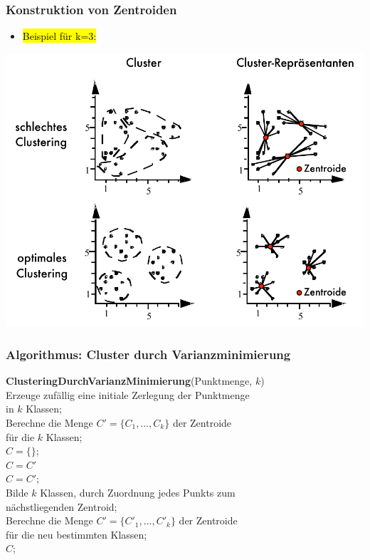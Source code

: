 \begin{frame}
\frametitle{Konstruktion von Zentroiden}

\begin{itemize}
\item \hl{Beispiel für k=3:}
\end{itemize}


\begin{center}
\includegraphics[scale=.5]{fig7/zentroiden-bsp.pdf}
\end{center}

\end{frame}


\begin{frame}
\frametitle{Algorithmus: Cluster durch  Varianzminimierung}

\begin{algo}
\textbf{ClusteringDurchVarianzMinimierung}(Punktmenge, $k$) \\
\1 \textrm{Erzeuge zufällig eine initiale Zerlegung der Punktmenge} \\
\2 \textrm{in $k$ Klassen;} \\
\1 \textrm{Berechne die Menge} $C'=\{C_1, \dots, C_k\}$ \textrm{der Zentroide} \\
\2 \textrm{für die $k$ Klassen;}  \\
\1 $C = \{\}$; \\
\1  $C = C'$ \\
\2 $C = C'$; \\
\2 \textrm{Bilde $k$ Klassen, durch Zuordnung jedes Punkts zum} \\
\3 \textrm{nächstliegenden Zentroid;}   \\
\2 \textrm{Berechne die Menge} $C'= \{C'_1, \dots, C'_k\}$ \textrm{der Zentroide} \\
\3 \textrm{für die neu bestimmten Klassen;} \\
\1  $C$; \\
\end{algo}
\end{frame}


